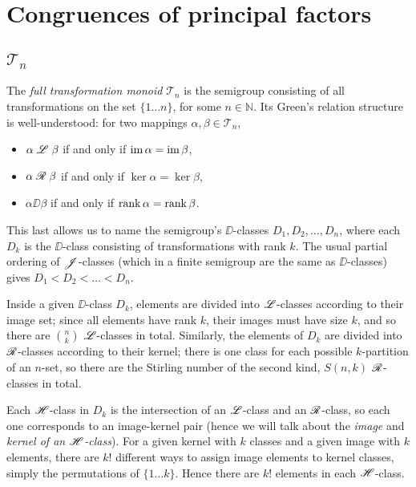 \chapter{Congruences of principal factors}
\label{chap:princfact}

\section{$\mathcal{T}_n$}
The \textit{full transformation monoid} $\mathcal{T}_n$ is the semigroup consisting of all
transformations on the set $\{1 \dots n\}$, for some $n \in \mathbb{N}$.  Its
Green's relation structure is well-understood: for two mappings $\alpha, \beta
\in \mathcal{T}_n$,

\begin{itemize}
\item $\alpha \mathrel{\mathscr{L}} \beta$ if and only if $\operatorname{im} \alpha = \operatorname{im} \beta$,
\item $\alpha \mathrel{\mathscr{R}} \beta$ if and only if $\ker \alpha = \ker \beta$,\cite[9.2]{ruskuc-notes}
\item $\alpha \DD \beta$ if and only if $\operatorname{rank} \alpha = \operatorname{rank} \beta$.\cite[10.6]{ruskuc-notes}
\end{itemize}

This last allows us to name the semigroup's $\DD$-classes $D_1, D_2,
\dots, D_n$, where each $D_k$ is the $\DD$-class consisting of
transformations with rank $k$.  The usual partial ordering of
$\mathrel{\mathscr{J}}$-classes \cite[p.47]{howie} (which in a finite semigroup are the
same as $\DD$-classes) gives $D_1 < D_2 < \dots < D_n$.

Inside a given $\DD$-class $D_k$, elements are divided into
$\mathrel{\mathscr{L}}$-classes according to their image set; since all elements have rank
$k$, their images must have size $k$, and so there are $\binom{n}{k}$
$\mathrel{\mathscr{L}}$-classes in total.  Similarly, the elements of $D_k$ are divided
into $\mathrel{\mathscr{R}}$-classes according to their kernel; there is one class for
each possible $k$-partition of an $n$-set, so there are the Stirling number of
the second kind, $S(n,k)$ $\mathrel{\mathscr{R}}$-classes in total.

Each $\mathrel{\mathscr{H}}$-class in $D_k$ is the intersection of an $\mathrel{\mathscr{L}}$-class
and an $\mathrel{\mathscr{R}}$-class, so each one corresponds to an image-kernel pair
(hence we will talk about the \textit{image} and \textit{kernel of an $\mathrel{\mathscr{H}}$-class}).
For a given kernel with $k$ classes and a given image with $k$ elements, there
are $k!$ different ways to assign image elements to kernel classes, simply the
permutations of $\{1 \dots k\}$.  Hence there are $k!$ elements in each
$\mathrel{\mathscr{H}}$-class.

